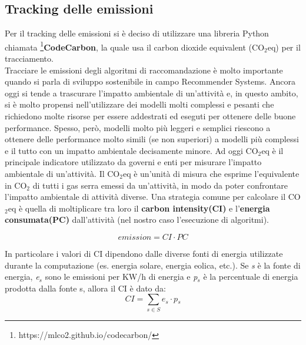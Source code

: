 \subsection{Tracking delle emissioni}
Per il tracking delle emissioni si è deciso di utilizzare una libreria Python chiamata \footnote{https://mlco2.github.io/codecarbon/}{\textbf{CodeCarbon}}, la quale usa il carbon dioxide equivalent (CO$_2$eq) per il tracciamento.\\
\noindent
Tracciare le emissioni degli algoritmi di raccomandazione è molto importante quando si parla di sviluppo sostenibile in campo Recommender Systems. Ancora oggi si tende a trascurare l'impatto ambientale di un'attività e, in questo ambito, si è molto propensi nell'utilizzare dei modelli molti complessi e pesanti
che richiedono molte risorse per essere addestrati ed eseguti per ottenere delle buone performance. Spesso, però, modelli molto più leggeri e semplici riescono a ottenere delle performance molto simili (se non superiori) a modelli più complessi e il tutto con un impatto ambientale decisamente minore.
Ad oggi CO$_2$eq è il principale indicatore utilizzato da governi e enti per misurare l'impatto ambientale di un'attività.
Il CO$_2$eq è un'unità di misura che esprime l'equivalente in CO$_2$ di tutti i gas serra emessi da un'attività, in modo da poter confrontare l'impatto ambientale di attività diverse.
Una strategia comune per calcolare il CO$_2$eq è quella di moltiplicare tra loro il \textbf{carbon intensity(CI)} e l'\textbf{energia consumata(PC)} dall'attività (nel nostro caso l'esecuzione di algoritmi).



\begin{equation}
    \textit{emission} = \textit{CI}  \cdot \textit{PC}
\end{equation}

\noindent In particolare i valori di CI dipendono dalle diverse fonti di energia utilizzate durante la computazione 
(es. energia solare, energia eolica, etc.). Se \textit{s} è la fonte di energia,  \textit{e$_s$} sono le emissioni per KW/h di energia e \textit{p$_s$}  è la percentuale di energia prodotta dalla fonte s, allora il CI è dato da:
\begin{equation}
    \textit{CI} = \sum_{s \in S} \textit{e$_s$} \cdot \textit{p$_s$}
\end{equation}

